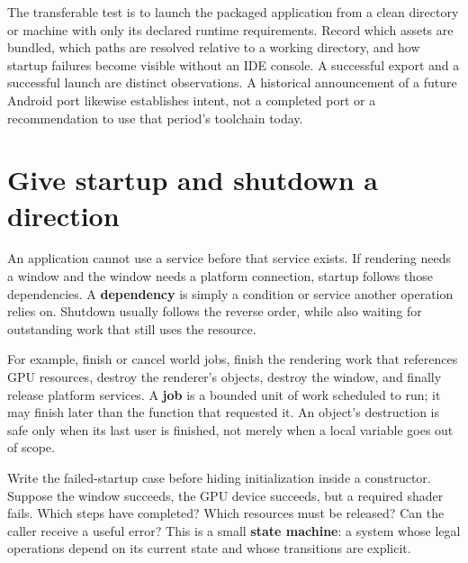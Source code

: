 The transferable test is to launch the packaged application from a clean directory or machine with only its declared runtime requirements. Record which assets are bundled, which paths are resolved relative to a working directory, and how startup failures become visible without an IDE console. A successful export and a successful launch are distinct observations. A historical announcement of a future Android port likewise establishes intent, not a completed port or a recommendation to use that period's toolchain today.

\section{Give startup and shutdown a direction}\label{05-engine-i-ch008-give-startup-and-shutdown-a-direction}

An application cannot use a service before that service exists. If rendering needs a window and the window needs a platform connection, startup follows those dependencies. A \textbf{dependency} is simply a condition or service another operation relies on. Shutdown usually follows the reverse order, while also waiting for outstanding work that still uses the resource.

For example, finish or cancel world jobs, finish the rendering work that references GPU resources, destroy the renderer's objects, destroy the window, and finally release platform services. A \textbf{job} is a bounded unit of work scheduled to run; it may finish later than the function that requested it. An object's destruction is safe only when its last user is finished, not merely when a local variable goes out of scope.

Write the failed-startup case before hiding initialization inside a constructor. Suppose the window succeeds, the GPU device succeeds, but a required shader fails. Which steps have completed? Which resources must be released? Can the caller receive a useful error? This is a small \textbf{state machine}: a system whose legal operations depend on its current state and whose transitions are explicit.

